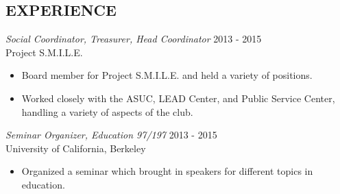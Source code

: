 \documentclass[margin]{res}
\begin{document}
\begin{resume}
\section{EXPERIENCE} {\sl Social Coordinator, Treasurer, Head Coordinator} \hfill            2013 - 2015\\
                Project S.M.I.L.E.
                 \begin{itemize}  \itemsep -2pt %
                 \item Board member for Project S.M.I.L.E. and
                                held a variety of positions.
                \item Worked closely with the ASUC, LEAD Center, and Public Service Center, handling a variety of aspects of the club.
                 \end{itemize}
                {\sl Seminar Organizer, Education 97/197} \hfill                       2013 - 2015\\
                University of California, Berkeley
                \begin{itemize} \itemsep -2pt
                \item Organized a seminar which brought in speakers for different topics in education.
                \end{itemize}

\end{resume}
\end{document}
